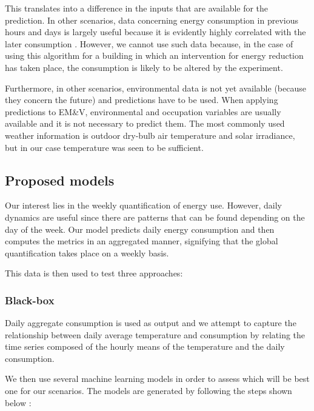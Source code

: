 \documentclass[10pt, conference, compsocconf]{IEEEtran}
\begin{document}
This translates into a difference in the inputs that are available for the prediction. In other scenarios, data concerning energy consumption in previous hours and days is largely useful because it is evidently highly correlated with the later consumption \cite{aman2014empirical}. However, we cannot use such data because, in the case of using this algorithm for a building in which an intervention for energy reduction has taken place, the consumption is likely to be altered by the experiment.

Furthermore, in other scenarios, environmental data is not yet available (because they concern the future) and predictions have to be used. When applying predictions to EM\&V, environmental and occupation variables are usually available and it is not necessary to predict them. The most commonly used weather information is outdoor dry-bulb air temperature and solar irradiance, but in our case temperature was seen to be sufficient.



\subsection{Proposed models}

Our interest lies in the weekly quantification of energy use. However, daily dynamics are useful since there are patterns that can be found depending on the day of the week. Our model predicts daily energy consumption and then computes the metrics in an aggregated manner, signifying that the global quantification takes place on a weekly basis.

This data is then used to test three approaches:

\subsubsection{Black-box}

Daily aggregate consumption is used as output and we attempt to capture the relationship between daily average temperature and consumption by relating the time series composed of the hourly means of the temperature and the daily consumption.

We then use several machine learning models in order to assess which will be best one for our scenarios. The models are generated by following the steps shown below \cite{gonzalez2016towards}:
\end{document}
